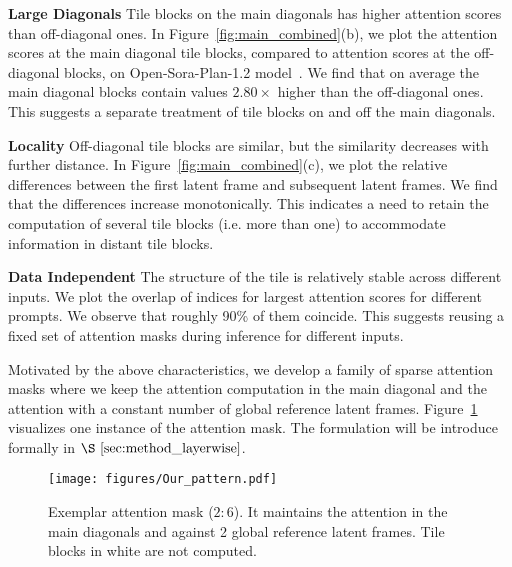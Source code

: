 
\textbf{Large Diagonals} Tile blocks on the main diagonals has higher attention scores than off-diagonal ones. In Figure~\ref{fig:main_combined}(b), we plot the attention scores at the main diagonal tile blocks, compared to attention scores at the off-diagonal blocks, on Open-Sora-Plan-1.2 model~\citep{pku_yuan_lab_and_tuzhan_ai_etc_2024_10948109}. We find that on average the main diagonal blocks contain values $2.80\times$ higher than the off-diagonal ones. This suggests a separate treatment of tile blocks on and off the main diagonals.


\textbf{Locality} Off-diagonal tile blocks are similar, but the similarity decreases with further distance. In Figure~\ref{fig:main_combined}(c), we plot the relative differences between the first latent frame and subsequent latent frames. We find that the differences increase monotonically. This indicates a need to retain the computation of several tile blocks (i.e. more than one) to accommodate information in distant tile blocks.

\textbf{Data Independent} The structure of the tile is relatively stable across different inputs. We plot the overlap of indices for largest attention scores for different prompts. We observe that roughly 90\% of them coincide. This suggests reusing a fixed set of attention masks during inference for different inputs. 

Motivated by the above characteristics, we develop a family of sparse attention masks where we keep the attention computation in the main diagonal and the attention with a constant number of global reference latent frames. Figure~\ref{fig:our_attention_pattern} visualizes one instance of the attention mask. The formulation will be introduce formally in $\S~\ref{sec:method_layerwise}$.

\begin{figure}[t]
\centering
\texttt{[image: figures/Our\_pattern.pdf]}
\caption{Exemplar attention mask ($2:6$). It maintains the attention in the main diagonals and against 2 global reference latent frames. Tile blocks in white are not computed.}%
\label{fig:our_attention_pattern}
\end{figure}

